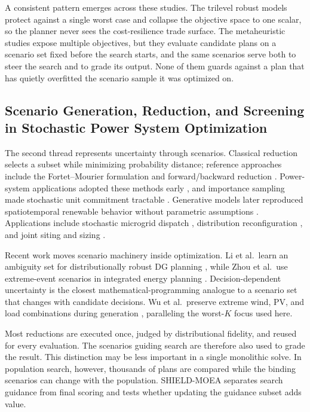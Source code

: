 \documentclass[energies,article,submit,moreauthors]{Definitions/mdpi}
\begin{document}
A consistent pattern emerges across these studies. The trilevel robust models protect against a single worst case and collapse the objective space to one scalar, so the planner never sees the cost-resilience trade surface. The metaheuristic studies expose multiple objectives, but they evaluate candidate plans on a scenario set fixed before the search starts, and the same scenarios serve both to steer the search and to grade its output. None of them guards against a plan that has quietly overfitted the scenario sample it was optimized on.

\subsection{Scenario Generation, Reduction, and Screening in Stochastic Power System Optimization}\label{scenario-generation-reduction-and-screening-in-stochastic-power-system-optimization}

The second thread represents uncertainty through scenarios. Classical reduction selects a subset while minimizing probability distance; reference approaches include the Fortet--Mourier formulation \cite{ref18} and forward/backward reduction \cite{ref19}. Power-system applications adopted these methods early \cite{ref20}, and importance sampling made stochastic unit commitment tractable \cite{ref21}. Generative models later reproduced spatiotemporal renewable behavior without parametric assumptions \cite{ref22}. Applications include stochastic microgrid dispatch \cite{ref23}, distribution reconfiguration \cite{ref24}, and joint siting and sizing \cite{ref25}.

Recent work moves scenario machinery inside optimization. Li et al.~learn an ambiguity set for distributionally robust DG planning \cite{ref26}, while Zhou et al.~use extreme-event scenarios in integrated energy planning \cite{ref27}. Decision-dependent uncertainty \cite{ref28} is the closest mathematical-programming analogue to a scenario set that changes with candidate decisions. Wu et al.~preserve extreme wind, PV, and load combinations during generation \cite{ref29}, paralleling the worst-\(K\) focus used here.

Most reductions are executed once, judged by distributional fidelity, and reused for every evaluation. The scenarios guiding search are therefore also used to grade the result. This distinction may be less important in a single monolithic solve. In population search, however, thousands of plans are compared while the binding scenarios can change with the population. SHIELD-MOEA separates search guidance from final scoring and tests whether updating the guidance subset adds value.
\end{document}

